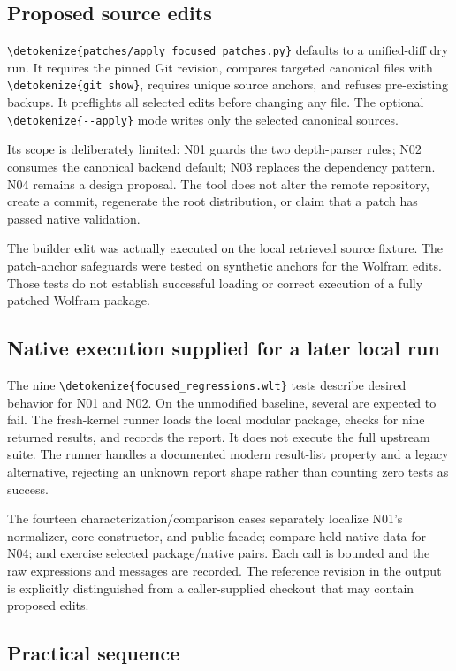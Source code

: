 \documentclass[11pt,a4paper]{article}
\newcommand{\wl}[1]{\texttt{\expandafter\nolinkurl\expandafter{\detokenize{#1}}}}
\begin{document}
\subsection{Proposed source edits}

\wl{patches/apply_focused_patches.py} defaults to a unified-diff dry run. It
requires the pinned Git revision, compares targeted canonical files with
\wl{git show}, requires unique source anchors, and refuses pre-existing backups.
It preflights all selected edits before changing any file. The optional
\wl{--apply} mode writes only the selected canonical sources.

Its scope is deliberately limited: N01 guards the two depth-parser rules;
N02 consumes the canonical backend default; N03 replaces the dependency pattern.
N04 remains a design proposal. The tool does not alter the remote repository,
create a commit, regenerate the root distribution, or claim that a patch has
passed native validation.

The builder edit was actually executed on the local retrieved source fixture.
The patch-anchor safeguards were tested on synthetic anchors for the Wolfram
edits. Those tests do not establish successful loading or correct execution of
a fully patched Wolfram package.

\subsection{Native execution supplied for a later local run}

The nine \wl{focused_regressions.wlt} tests describe desired behavior for N01
and N02. On the unmodified baseline, several are expected to fail. The
fresh-kernel runner loads the local modular package, checks for nine returned
results, and records the report. It does not execute the full upstream suite.
The runner handles a documented modern result-list property and a legacy
alternative, rejecting an unknown report shape rather than counting zero tests
as success.\cite{wltestreport}

The fourteen characterization/comparison cases separately localize N01's
normalizer, core constructor, and public facade; compare held native data for
N04; and exercise selected package/native pairs. Each call is bounded and the
raw expressions and messages are recorded. The reference revision in the output
is explicitly distinguished from a caller-supplied checkout that may contain
proposed edits.

\subsection{Practical sequence}
\end{document}
